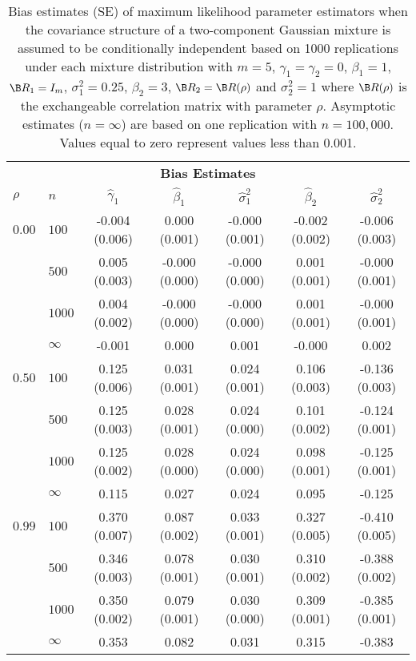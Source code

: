 \begin{table}[ht]
\begin{center}
\begin{tabular}{llccccc}
   \hline \multicolumn{7}{c}{\textbf{Bias Estimates}}\\ $\rho$ & $n$ & $\widehat{\gamma}_1$ & $\widehat{\beta}_1$ & $\widehat{\sigma}^2_1$ & $\widehat{\beta}_2$ & $\widehat{\sigma}^2_2$ \\ 
   \hline$0.00$ & $100$ & -0.004 (0.006) & 0.000 (0.001) & -0.000 (0.001) & -0.002 (0.002) & -0.006 (0.003) \\ 
    & $500$ & 0.005 (0.003) & -0.000 (0.000) & -0.000 (0.000) & 0.001 (0.001) & -0.000 (0.001) \\ 
    & $1000$ & 0.004 (0.002) & -0.000 (0.000) & -0.000 (0.000) & 0.001 (0.001) & -0.000 (0.001) \\ 
    & $\infty$ & -0.001 & 0.000 & 0.001 & -0.000 & 0.002 \\ 
  $0.50$ & $100$ & 0.125 (0.006) & 0.031 (0.001) & 0.024 (0.001) & 0.106 (0.003) & -0.136 (0.003) \\ 
    & $500$ & 0.125 (0.003) & 0.028 (0.001) & 0.024 (0.000) & 0.101 (0.002) & -0.124 (0.001) \\ 
    & $1000$ & 0.125 (0.002) & 0.028 (0.000) & 0.024 (0.000) & 0.098 (0.001) & -0.125 (0.001) \\ 
    & $\infty$ & 0.115 & 0.027 & 0.024 & 0.095 & -0.125 \\ 
  $0.99$ & $100$ & 0.370 (0.007) & 0.087 (0.002) & 0.033 (0.001) & 0.327 (0.005) & -0.410 (0.005) \\ 
    & $500$ & 0.346 (0.003) & 0.078 (0.001) & 0.030 (0.001) & 0.310 (0.002) & -0.388 (0.002) \\ 
    & $1000$ & 0.350 (0.002) & 0.079 (0.001) & 0.030 (0.000) & 0.309 (0.001) & -0.385 (0.001) \\ 
    & $\infty$ & 0.353 & 0.082 & 0.031 & 0.315 & -0.383 \\ 
   \hline\end{tabular}
\caption{Bias estimates (SE) of maximum likelihood parameter estimators when the covariance structure of a two-component Gaussian mixture is assumed to be conditionally independent based on 1000 replications under each mixture distribution with $m=5$, $\gamma_1=\gamma_2=0$, $\beta_{1}=1$, $\B R_1=I_{m}$, $\sigma_1^{2}=0.25$, $\beta_2=3$, $\B R_2=\B R(\rho)$ and $\sigma_2^{2}=1$ where $\B R(\rho)$ is the exchangeable correlation matrix with parameter $\rho$. Asymptotic estimates ($n=\infty$) are based on one replication with $n=100,000$. Values equal to zero represent values less than 0.001.}
\label{tab:dep1}
\end{center}
\end{table}
